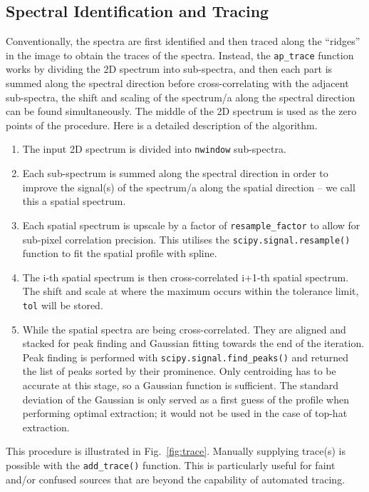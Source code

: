 \documentclass[fleqn,usenatbib]{mnras}
\begin{document}
\subsection{Spectral Identification and Tracing}
\label{sec:tracing}
Conventionally, the spectra are first identified and then traced along
the ``ridges'' in the image to obtain the traces of the spectra.
Instead, the \texttt{ap\_trace} function works by dividing the 2D
spectrum into sub-spectra, and then each part is summed along the
spectral direction before cross-correlating with the adjacent
sub-spectra, the shift and scaling of the spectrum/a along the
spectral direction can be found simultaneously. The middle of the
2D spectrum is used as the zero points of the procedure. Here is a
detailed description of the algorithm.
\begin{enumerate}
    \item
        The input 2D spectrum is divided into \texttt{nwindow}
        sub-spectra.
    \item
        Each sub-spectrum is summed along the spectral direction
        in order to improve the signal(s) of the spectrum/a along
        the spatial direction – we call this a spatial spectrum.
    \item
        Each spatial spectrum is upscale by a factor of
        \texttt{resample\_factor} to allow for sub-pixel correlation
        precision. This utilises the \texttt{scipy.signal.resample()}
        function to fit the spatial profile with spline.
    \item
        The i-th spatial spectrum is then cross-correlated i+1-th
        spatial spectrum. The shift and scale at where the maximum
        occurs within the tolerance limit, \texttt{tol} will be stored.
    \item
        While the spatial spectra are being cross-correlated. They
        are aligned and stacked for peak finding and Gaussian fitting
        towards the end of the iteration. Peak finding is performed with
        \texttt{scipy.signal.find\_peaks()} and returned the list of
        peaks sorted by their prominence. Only centroiding has to be
        accurate at this stage, so a Gaussian function is sufficient.
        The standard deviation of the Gaussian is only served as a
        first guess of the profile when performing optimal extraction;
        it would not be used in the case of top-hat extraction.
\end{enumerate}

This procedure is illustrated in Fig.~\ref{fig:trace}. Manually
supplying trace(s) is possible with the \texttt{add\_trace()}
function. This is particularly useful for faint and/or confused
sources that are beyond the capability of automated tracing.
\end{document}
